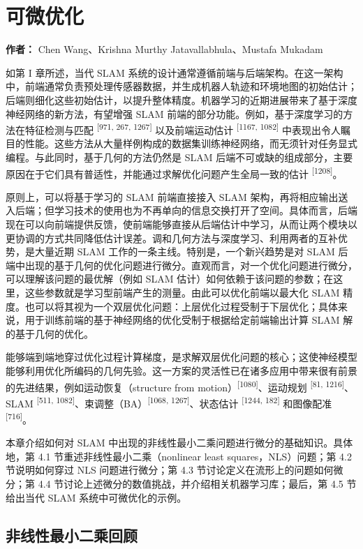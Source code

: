\chapter{可微优化}

\textbf{作者：} Chen Wang、Krishna Murthy Jatavallabhula、Mustafa Mukadam

如第 I 章所述，当代 SLAM 系统的设计通常遵循前端与后端架构。在这一架构中，前端通常负责预处理传感器数据，并生成机器人轨迹和环境地图的初始估计；后端则细化这些初始估计，以提升整体精度。机器学习的近期进展带来了基于深度神经网络的新方法，有望增强 SLAM 前端的部分功能。例如，基于深度学习的方法在特征检测与匹配 \textsuperscript{[971, 267, 1267]} 以及前端运动估计 \textsuperscript{[1167, 1082]} 中表现出令人瞩目的性能。这些方法从大量样例构成的数据集训练神经网络，而无须针对任务显式编程。与此同时，基于几何的方法仍然是 SLAM 后端不可或缺的组成部分，主要原因在于它们具有普适性，并能通过求解优化问题产生全局一致的估计 \textsuperscript{[1208]}。

原则上，可以将基于学习的 SLAM 前端直接接入 SLAM 架构，再将相应输出送入后端；但学习技术的使用也为不再单向的信息交换打开了空间。具体而言，后端现在可以向前端提供反馈，使前端能够直接从后端估计中学习，从而让两个模块以更协调的方式共同降低估计误差。调和几何方法与深度学习、利用两者的互补优势，是大量近期 SLAM 工作的一条主线。特别是，一个新兴趋势是对 SLAM 后端中出现的基于几何的优化问题进行微分。直观而言，对一个优化问题进行微分，可以理解该问题的最优解（例如 SLAM 估计）如何依赖于该问题的参数；在这里，这些参数就是学习型前端产生的测量。由此可以优化前端以最大化 SLAM 精度。也可以将其视为一个双层优化问题：上层优化过程受制于下层优化；具体来说，用于训练前端的基于神经网络的优化受制于根据给定前端输出计算 SLAM 解的基于几何的优化。

能够端到端地穿过优化过程计算梯度，是求解双层优化问题的核心；这使神经模型能够利用优化所编码的几何先验。这一方案的灵活性已在诸多应用中带来很有前景的先进结果，例如运动恢复（structure from motion）\textsuperscript{[1080]}、运动规划 \textsuperscript{[81, 1216]}、SLAM \textsuperscript{[511, 1082]}、束调整（BA）\textsuperscript{[1068, 1267]}、状态估计 \textsuperscript{[1244, 182]} 和图像配准 \textsuperscript{[716]}。

本章介绍如何对 SLAM 中出现的非线性最小二乘问题进行微分的基础知识。具体地，第 4.1 节重述非线性最小二乘（nonlinear least squares，NLS）问题；第 4.2 节说明如何穿过 NLS 问题进行微分；第 4.3 节讨论定义在流形上的问题如何微分；第 4.4 节讨论上述微分的数值挑战，并介绍相关机器学习库；最后，第 4.5 节给出当代 SLAM 系统中可微优化的示例。

\section{非线性最小二乘回顾}

